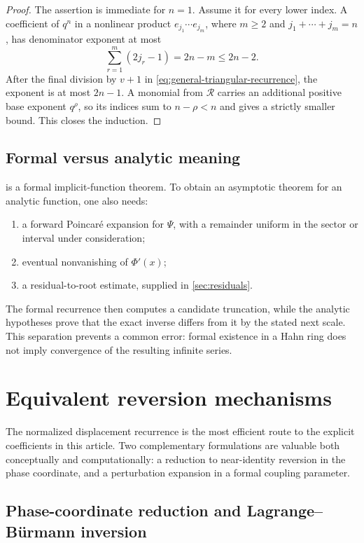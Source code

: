 \documentclass[11pt,oneside]{article}
\theoremstyle{plain}
\theoremstyle{definition}
\theoremstyle{remark}
\newcommand{\Rcal}{\mathcal{R}}
\begin{document}
\begin{proof}
The assertion is immediate for \(n=1\).  Assume it for every lower index.
A coefficient of \(q^n\) in a nonlinear product
\(e_{j_1}\cdots e_{j_m}\), where \(m\ge2\) and
\(j_1+\cdots+j_m=n\), has denominator exponent at most
\[
 \sum_{r=1}^m(2j_r-1)=2n-m\le2n-2.
\]
After the final division by \(v+1\) in
\cref{eq:general-triangular-recurrence}, the exponent is at most \(2n-1\).
A monomial from \(\Rcal\) carries an additional positive base exponent
\(q^\rho\), so its indices sum to \(n-\rho<n\) and gives a strictly smaller
bound.  This closes the induction.
\end{proof}

\subsection{Formal versus analytic meaning}

 is a formal implicit-function theorem.  To obtain an
asymptotic theorem for an analytic function, one also needs:
\begin{enumerate}
\item a forward Poincar\'e expansion for \(\Psi\), with a remainder uniform in
      the sector or interval under consideration;
\item eventual nonvanishing of \(\Phi'(x)\);
\item a residual-to-root estimate, supplied in \cref{sec:residuals}.
\end{enumerate}
The formal recurrence then computes a candidate truncation, while the analytic
hypotheses prove that the exact inverse differs from it by the stated next
scale.  This separation prevents a common error: formal existence in a Hahn
ring does not imply convergence of the resulting infinite series.

\section{Equivalent reversion mechanisms}
\label{sec:mechanisms}

The normalized displacement recurrence is the most efficient route to the
explicit coefficients in this article.  Two complementary formulations are
valuable both conceptually and computationally: a reduction to near-identity
reversion in the phase coordinate, and a perturbation expansion in a formal
coupling parameter.

\subsection{Phase-coordinate reduction and Lagrange--B\"urmann inversion}
\label{sec:phase-coordinate}
\end{document}
